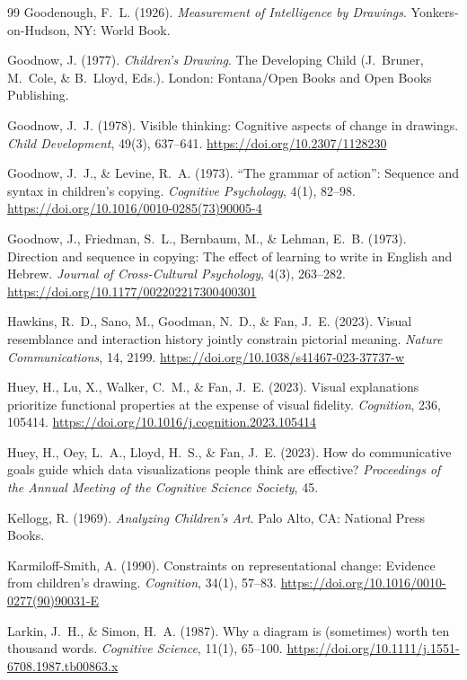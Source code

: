 \documentclass[11pt]{article}
\theoremstyle{remark}
\begin{document}
\begin{thebibliography}{99}
Goodenough, F.~L. (1926).
\emph{Measurement of Intelligence by Drawings}.
Yonkers-on-Hudson, NY: World Book.

Goodnow, J. (1977).
\emph{Children's Drawing}.
The Developing Child (J.~Bruner, M.~Cole, \& B.~Lloyd, Eds.).
London: Fontana/Open Books and Open Books Publishing.

Goodnow, J.~J. (1978).
Visible thinking: Cognitive aspects of change in drawings.
\emph{Child Development}, 49(3), 637--641.
\url{https://doi.org/10.2307/1128230}

Goodnow, J.~J., \& Levine, R.~A. (1973).
``The grammar of action'': Sequence and syntax in children's copying.
\emph{Cognitive Psychology}, 4(1), 82--98.
\url{https://doi.org/10.1016/0010-0285(73)90005-4}

Goodnow, J., Friedman, S.~L., Bernbaum, M., \& Lehman, E.~B. (1973).
Direction and sequence in copying: The effect of learning to write in English and Hebrew.
\emph{Journal of Cross-Cultural Psychology}, 4(3), 263--282.
\url{https://doi.org/10.1177/002202217300400301}

Hawkins, R.~D., Sano, M., Goodman, N.~D., \& Fan, J.~E. (2023).
Visual resemblance and interaction history jointly constrain pictorial meaning.
\emph{Nature Communications}, 14, 2199.
\url{https://doi.org/10.1038/s41467-023-37737-w}

Huey, H., Lu, X., Walker, C.~M., \& Fan, J.~E. (2023).
Visual explanations prioritize functional properties at the expense of visual fidelity.
\emph{Cognition}, 236, 105414.
\url{https://doi.org/10.1016/j.cognition.2023.105414}

Huey, H., Oey, L.~A., Lloyd, H.~S., \& Fan, J.~E. (2023).
How do communicative goals guide which data visualizations people think are effective?
\emph{Proceedings of the Annual Meeting of the Cognitive Science Society}, 45.

Kellogg, R. (1969).
\emph{Analyzing Children's Art}.
Palo Alto, CA: National Press Books.

Karmiloff-Smith, A. (1990).
Constraints on representational change: Evidence from children's drawing.
\emph{Cognition}, 34(1), 57--83.
\url{https://doi.org/10.1016/0010-0277(90)90031-E}

Larkin, J.~H., \& Simon, H.~A. (1987).
Why a diagram is (sometimes) worth ten thousand words.
\emph{Cognitive Science}, 11(1), 65--100.
\url{https://doi.org/10.1111/j.1551-6708.1987.tb00863.x}


\end{thebibliography}
\end{document}
